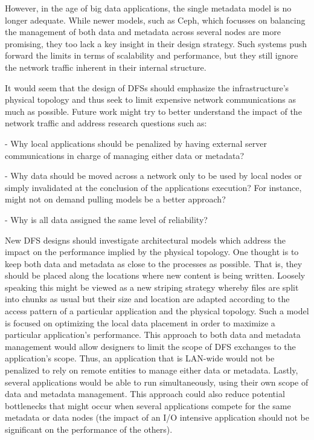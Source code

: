 \documentclass[11pt]{article}
\begin{document}
However, in the age of big data applications, the single metadata model is no 
longer adequate. While newer models, such as Ceph, which focusses on balancing 
the management of both data and metadata across several nodes are more promising, 
they too lack a key insight in their design strategy. Such systems push forward 
the limits in terms of scalability and performance, but they still ignore the 
network traffic inherent in their internal structure.

It would seem that the design of DFSs should emphasize the infrastructure’s 
physical topology and thus seek to limit expensive network communications as 
much as possible. Future work might try to better understand the impact of the 
network traffic and address research questions such as:

- Why local applications should be penalized by having external server 
communications in charge of managing either data or metadata?

- Why data should be moved across a network only to be used by local nodes or 
simply invalidated at the conclusion of the applications execution?  For instance, 
might not on demand pulling models be a better approach?

- Why is all data assigned the same level of reliability?

New DFS designs should investigate architectural models which address the impact 
on the performance implied by the physical topology. One thought is to keep both 
data and metadata as close to the processes as possible. That is, they should be 
placed along the locations where new content is being written. Loosely speaking this 
might be viewed as a new striping strategy whereby files are split into chunks as 
usual but their size and location are adapted according to the access pattern of a 
particular application and the physical topology. Such a model is focused on 
optimizing the local data placement in order to maximize a particular application’s 
performance. This approach to both data and metadata management would allow designers 
to limit the scope of DFS exchanges to the application’s scope. Thus, an application 
that is LAN-wide would not be penalized to rely on remote entities to manage either 
data or metadata. Lastly, several applications would be able to run simultaneously, 
using their own scope of data and metadata management. This approach could also reduce 
potential bottlenecks that might occur when several applications compete for the same 
metadata or data nodes (the impact of an I/O intensive application should not be 
significant on the performance of the others).
\end{document}
